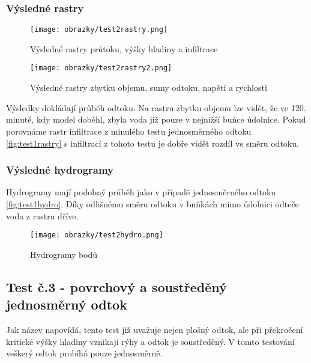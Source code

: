 \subsubsection{Výsledné rastry} \label{subsubsection:test2rastry}
\begin{figure}[hbt]
  \centering
  \texttt{[image: obrazky/test2rastry.png]}
  \caption{Výsledné rastry průtoku, výšky hladiny a infiltrace}
  \label{fig:test2rastry}
\end{figure}
\clearpage
\newpage
\begin{figure}[hbt]
  \centering
  \texttt{[image: obrazky/test2rastry2.png]}
  \caption{Výsledné rastry zbytku objemu, sumy odtoku, napětí a rychlosti}
  \label{fig:test2rastry2}
\end{figure}
\clearpage
Výsledky dokládají průběh odtoku. Na rastru zbytku objemu lze vidět, že ve 120. minutě, kdy model doběhl, zbyla voda již pouze v nejnižší buňce údolnice.
Pokud porovnáme rastr infiltrace z minulého testu jednosměrného odtoku \ref{fig:test1rastry} s infiltrací z tohoto testu je dobře vidět rozdíl ve směru odtoku.  
\subsubsection{Výsledné hydrogramy} \label{subsubsection:test2hydro}
Hydrogramy mají podobný průběh jako v případě jednosměrného odtoku \ref{fig:test1hydro}. Díky odlišnému směru odtoku v buňkách mimo údolnici odteče voda z rastru dříve.   
\begin{figure}[hbt]
  \centering
  \texttt{[image: obrazky/test2hydro.png]}
  \caption{Hydrogramy bodů}
  \label{fig:test2hydro}
\end{figure}
\clearpage
\subsection{Test č.3 - povrchový a soustředěný jednosměrný odtok} \label{subsection:test3testovni}
Jak název napovídá, tento test již uvažuje nejen plošný odtok, ale při překročení kritické výšky hladiny vznikají rýhy a odtok je soustředěný. V tomto testování veškerý odtok probíhá pouze jednosměrně.
